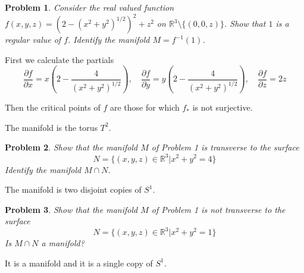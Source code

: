 \documentclass[10pt]{article}
\newcommand{\sk}{\vskip10mm}
\newcommand{\bb}[1]{\mathbb{#1}}
\theoremstyle{plain}
\newtheorem{problem}{Problem}
\theoremstyle{remark}
\begin{document}
\begin{problem}
  Consider the real valued function $f(x,y,z)=(2-(x^2+y^2)^{1/2})^2+z^2$
  on $\bb{R}^3\setminus\{(0,0,z)\}$. Show that $1$ is a regular value of $f$.
  Identify the manifold $M=f^{-1}(1)$.
\end{problem}

First we calculate the partials
\[
  \frac{\partial f}{\partial x}=x\left(2-\frac{4}{(x^2+y^2)^{1/2}}\right) ,
  \quad\frac{\partial f}{\partial y}=y\left(2-\frac{4}{(x^2+y^2)^{1/2}}\right) ,
  \quad\frac{\partial f}{\partial z}= 2z 
\]

Then the critical points of $f$ are those for which $f_*$ is not
surjective.

The manifold is the torus $T^2$.

\sk

\begin{problem}
  Show that the manifold $M$ of Problem 1 is transverse to the surface
  \[
    N=\{(x,y,z)\in\bb{R}^3|x^2+y^2=4\}
  \]
  Identify the manifold $M\cap N$.
\end{problem}


The manifold is two disjoint copies of $S^1$.
\sk

\begin{problem}
  Show that the manifold $M$ of Problem 1 is not transverse to the surface
  \[
    N=\{(x,y,z)\in\bb{R}^3|x^2+y^2=1\}
  \]
  Is $M\cap N$ a manifold?
\end{problem}


It is a manifold and it is a single copy of $S^1$.

\end{document}
